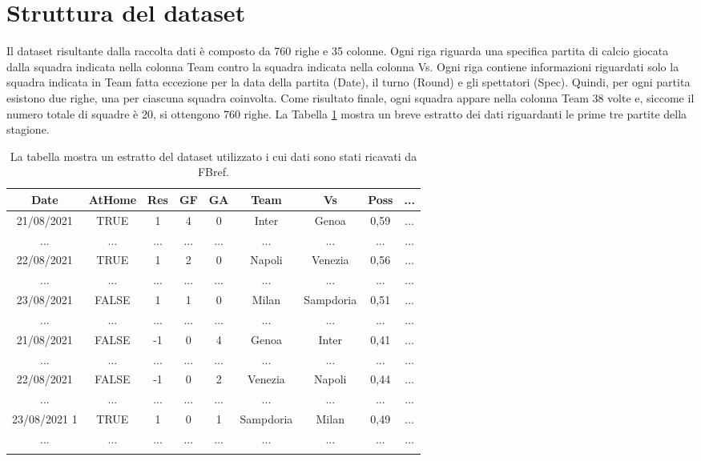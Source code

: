\section{Struttura del dataset}
Il dataset risultante dalla raccolta dati è composto da 760 righe e 35 colonne. Ogni riga riguarda una specifica partita di calcio giocata dalla squadra indicata nella colonna \textsf{Team} contro la squadra indicata nella colonna \textsf{Vs}. Ogni riga contiene informazioni riguardati solo la squadra indicata in \textsf{Team} fatta eccezione per la data della partita (\textsf{Date}), il turno (\textsf{Round}) e gli spettatori (\textsf{Spec}). Quindi, per ogni partita esistono due righe, una per ciascuna squadra coinvolta. Come risultato finale, ogni squadra appare nella colonna \textsf{Team} 38 volte e, siccome il numero totale di squadre è 20, si ottengono 760 righe. %
La Tabella \ref{tab:db} mostra un breve estratto dei dati riguardanti le prime tre partite della stagione. 
	\begin{table}[!ht]%

	\renewcommand{\arraystretch}{1.7}
	\centering
	\begin{tabular}{c c c c c c c c c  }
		\hline	

		\textbf{Date} & \textbf{AtHome} & \textbf{Res} & \textbf{GF} & \textbf{GA} & \textbf{Team} & \textbf{Vs} & \textbf{Poss} & \textbf{...}   \\	
		\hline	
		21/08/2021 & TRUE & 1 & 4 & 0 & Inter & Genoa & 0,59 & ... \\
		... & ... & ... & ... & ... & ... & ... & ... & ... \\
		22/08/2021  & TRUE & 1 & 2 & 0 & Napoli & Venezia & 0,56 & ... \\
		... & ... & ... & ... & ... & ... & ... & ... & ...  \\
		23/08/2021  & FALSE & 1 & 1 & 0 & Milan & Sampdoria & 0,51 & ... \\		
		... & ... & ... & ... & ... & ... & ... & ... & ... \\
		21/08/2021  & FALSE & -1 & 0 & 4 & Genoa & Inter & 0,41 & ... \\
		... & ... & ... & ... & ... & ... & ... & ... & ...  \\
		22/08/2021  & FALSE & -1 & 0 & 2 & Venezia & Napoli & 0,44 & ... \\
		... & ... & ... & ... & ... & ... & ... & ... & ...  \\
		23/08/2021 1 & TRUE & 1 & 0 & 1 & Sampdoria & Milan & 0,49 & ... \\
		... & ... & ... & ... & ... & ... & ... & ... & ...  \\
		\hline
		& & & & & & & & \\
		
		
		
	\end{tabular} \hbox{}
	
	\caption{La tabella mostra un estratto del dataset utilizzato i cui dati sono stati ricavati da FBref.} \label{tab:db}
\end{table}

